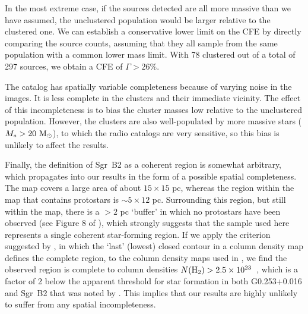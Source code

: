 \documentclass[twocolumn]{aastex62}
\begin{document}
In the most extreme case, if the sources detected are all more massive than we
have assumed, the unclustered population would be larger relative to the clustered one.
We can establish a conservative lower limit on the CFE by directly comparing the
source counts, assuming that they all sample from the same population with a
common lower mass limit.  With 78 clustered out of a total of 297 sources, we
obtain a CFE of $\Gamma>26\%$.


The catalog has spatially variable completeness because of varying noise in the
images.  It is less complete in the clusters and their immediate vicinity.  The
effect of this incompleteness is to bias the cluster masses low relative to the
unclustered population.  However, the clusters are also well-populated by more
massive stars ($M_*>20~\mathrm{M}_{\odot}$), to which the radio catalogs are very sensitive,
so this bias is unlikely to affect the results.

Finally, the definition of Sgr~B2 as a coherent region is somewhat arbitrary,
which propagates into our results in the form of a possible spatial
completeness.  The \citet{Ginsburg2018a} map covers a large area of about
$15\times15$ pc, whereas the region within the map that contains protostars is
$\sim5\times12$ pc. Surrounding this region, but still within the map, there is
a $>2$ pc `buffer' in which no protostars have been observed (see Figure 8 of
\citealt{Ginsburg2018a}), which strongly suggests that the sample used here
represents a single coherent star-forming region. If we apply the criterion
suggested by \citet{Alves2017b}, in which the `last' (lowest) closed contour in
a column density map defines the complete region, to the column density maps
used in \citet{Ginsburg2018a}, we find the observed region is complete to
column densities $N(\textrm{H}_{2}) > 2.5\times10^{23}$~\persc, which is a factor of 2 below the
apparent threshold for star formation in both G0.253+0.016 and Sgr~B2 that was
noted by \citet{Ginsburg2018a}. This implies that our results are highly
unlikely to suffer from any spatial incompleteness.
\end{document}
